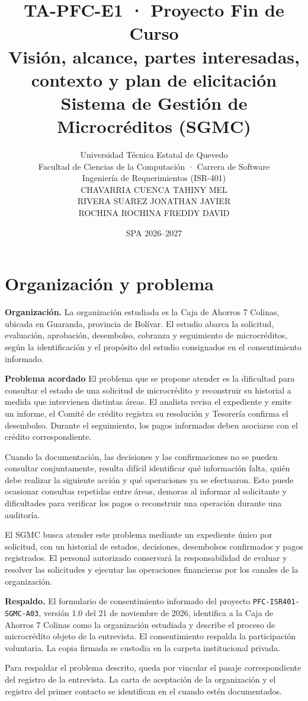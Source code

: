 \documentclass[11pt,a4paper]{article}
\title{TA-PFC-E1 · Proyecto Fin de Curso\\
Visión, alcance, partes interesadas, contexto y plan de elicitación\\
Sistema de Gestión de Microcréditos (SGMC)}
\author{Universidad Técnica Estatal de Quevedo\\
Facultad de Ciencias de la Computación · Carrera de Software\\
Ingeniería de Requerimientos (ISR-401)\\[0.6em]
CHAVARRIA CUENCA TAHINY MEL\\
RIVERA SUAREZ JONATHAN JAVIER\\
ROCHINA ROCHINA FREDDY DAVID}
\date{SPA 2026--2027}
\begin{document}
\maketitle

\section{Organización y problema}
\textbf{Organización.}
La organización estudiada es la Caja de Ahorros 7 Colinas,
ubicada en Guaranda, provincia de Bolívar. El estudio abarca
la solicitud, evaluación, aprobación, desembolso, cobranza
y seguimiento de microcréditos, según la identificación y el
propósito del estudio consignados en el consentimiento informado.


\textbf{Problema acordado}
El problema que se propone atender es la dificultad para consultar
el estado de una solicitud de microcrédito y reconstruir su historial
a medida que intervienen distintas áreas. El analista revisa el
expediente y emite un informe, el Comité de crédito registra su
resolución y Tesorería confirma el desembolso. Durante el seguimiento,
los pagos informados deben asociarse con el crédito correspondiente.

Cuando la documentación, las decisiones y las confirmaciones no se
pueden consultar conjuntamente, resulta difícil identificar qué
información falta, quién debe realizar la siguiente acción y qué
operaciones ya se efectuaron. Esto puede ocasionar consultas
repetidas entre áreas, demoras al informar al solicitante y
dificultades para verificar los pagos o reconstruir una operación
durante una auditoría.

El SGMC busca atender este problema mediante un expediente único por
solicitud, con un historial de estados, decisiones, desembolsos
confirmados y pagos registrados. El personal autorizado conservará la
responsabilidad de evaluar y resolver las solicitudes y ejecutar las
operaciones financieras por los canales de la organización.


\textbf{Respaldo.}
El formulario de consentimiento informado del proyecto
\texttt{PFC-ISR401-SGMC-A03}, versión 1.0 del 21 de noviembre de
2026, identifica a la Caja de Ahorros 7 Colinas como la organización
estudiada y describe el proceso de microcrédito objeto de la
entrevista. El consentimiento respalda la participación voluntaria.
La copia firmada se custodia en la carpeta institucional privada.

Para respaldar el problema descrito, queda por vincular el pasaje
correspondiente del registro de la entrevista. La carta de aceptación
de la organización y el registro del primer contacto se identifican
en el  cuando estén documentados.
\end{document}
